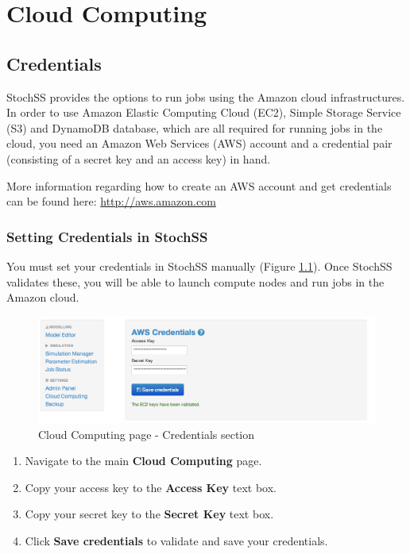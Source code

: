 \chapter{Cloud Computing}
\label{sec:cc}
\section{Credentials}
StochSS provides the options to run jobs using the Amazon cloud infrastructures. In order to use Amazon Elastic Computing Cloud (EC2), Simple Storage Service (S3) and DynamoDB database, which are all required for running jobs in the cloud, you need an Amazon Web Services (AWS) account and a credential pair (consisting of a secret key and an access key) in hand. 

More information regarding how to create an AWS account and get credentials can be found here: \url{http://aws.amazon.com}

\subsection{Setting Credentials in StochSS}
You must set your credentials in StochSS manually (Figure \ref{fig:1}). Once StochSS validates these, you will be able to launch compute nodes and run jobs in the Amazon cloud.

\begin{figure}[!ht]
\centering
\includegraphics[scale=0.45]{T6/T6_fig_credentials.png}
\caption{Cloud Computing page - Credentials section}
\label{fig:1}
\end{figure}

\begin{enumerate}
\item Navigate to the main \textbf{Cloud Computing} page.
\item Copy your access key to the \textbf{Access Key} text box.
\item Copy your secret key to the \textbf{Secret Key} text box. 
\item Click \textbf{Save credentials} to validate and save your credentials.
\end{enumerate}

